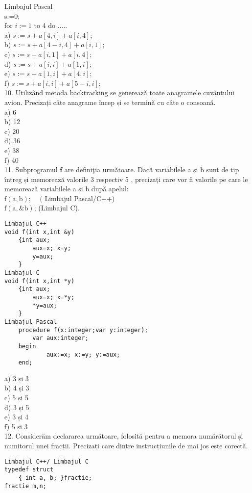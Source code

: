 Limbajul Pascal\\
s:=0;\\
for $i:=1$ to 4 do .....\\
a) $s:=s+a[4, i]+a[i, 4]$;\\
b) $s:=s+a[4-i, 4]+a[i, 1]$;\\
c) $s:=s+a[i, 1]+a[i, 4]$;\\
d) $s:=s+a[i, i]+a[1, i]$;\\
e) $s:=s+a[1, i]+a[4, i]$;\\
f) $s:=s+a[i, i]+a[5-i, i]$;\\
10. Utilizând metoda backtracking se generează toate anagramele cuvântului avion. Precizați câte anagrame încep și se termină cu câte o consoană.\\
a) 6\\
b) 12\\
c) 20\\
d) 36\\
e) 38\\
f) 40\\
11. Subprogramul $\mathbf{f}$ are definiţia următoare. Dacă variabilele a și b sunt de tip întreg și memorează valorile 3 respectiv 5 , precizați care vor fi valorile pe care le memorează variabilele a și b după apelul:\\
$\mathrm{f}(\mathrm{a}, \mathrm{b})$; $\quad($ Limbajul Pascal/C++)\\
$\mathrm{f}(\mathrm{a}, \mathrm{\& b})$; (Limbajul C).

\begin{verbatim}
Limbajul C++
void f(int x,int &y)
    {int aux;
        aux=x; x=y;
        y=aux;
    }
Limbajul C
void f(int x,int *y)
    {int aux;
        aux=x; x=*y;
        *y=aux;
    }
Limbajul Pascal
    procedure f(x:integer;var y:integer);
        var aux:integer;
    begin
            aux:=x; x:=y; y:=aux;
    end;
\end{verbatim}

a) 3 și 3\\
b) 4 și 3\\
c) 5 și 5\\
d) 3 și 5\\
e) 3 și 4\\
f) 5 și 3\\
12. Considerăm declararea următoare, folosită pentru a memora numărătorul și numitorul unei fracții. Precizați care dintre instrucțiunile de mai jos este corectă.

\begin{verbatim}
Limbajul C++/ Limbajul C
typedef struct
    { int a, b; }fractie;
fractie m,n;
\end{verbatim}

